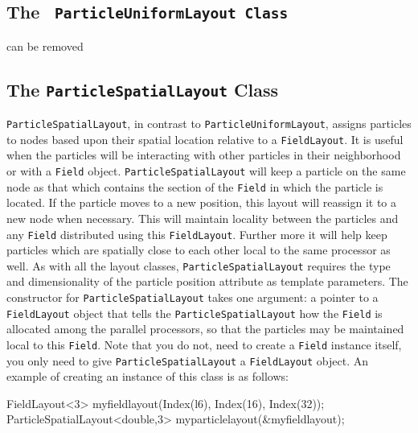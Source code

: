 \subsection{The \texttt{{\color{red} ParticleUniformLayout} Class}}
{\color{red} can be removed}

\subsection{The \texttt{ParticleSpatialLayout} Class}

\texttt{ParticleSpatialLayout}, in contrast to \texttt{ParticleUniformLayout}, assigns particles to nodes based upon their spatial location relative to a \texttt{FieldLayout}. It is useful when the particles will be interacting with other particles in their neighborhood or with a \texttt{Field} object. \texttt{ParticleSpatialLayout} will keep a particle on the same node as that which contains the section of the \texttt{Field} in which the particle is located. If the particle moves to a new position, this layout will reassign it to a new node when necessary. This will maintain locality between the particles and any \texttt{Field} distributed using this \texttt{FieldLayout}. Further more it will help keep particles which are spatially close to each other local to the same processor as well. As with all the layout classes, \texttt{ParticleSpatialLayout} requires the type and dimensionality of the particle position attribute as template parameters. The constructor for \texttt{ParticleSpatialLayout} takes one argument: a pointer to a \texttt{FieldLayout} object that tells the \texttt{ParticleSpatialLayout} how the \texttt{Field} is allocated among the parallel processors, so that the particles may be maintained local to this \texttt{Field}. Note that you do not, need to create a \texttt{Field} instance itself, you only need to give \texttt{ParticleSpatialLayout} a \texttt{FieldLayout} object. An example of creating an instance of this class is as follows:
\begin{smallcode}
FieldLayout<3> myfieldlayout(Index(l6), Index(16), Index(32));
ParticleSpatialLayout<double,3> myparticlelayout(&myfieldlayout);
\end{smallcode}


